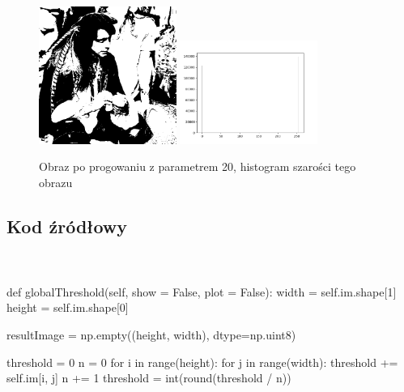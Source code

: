\documentclass[final,a4paper,openany,12pt]{mwbk}
\begin{document}
\begin{figure}[H]
	\begin{center}
		\includegraphics[width=0.4\textwidth]{pirate_gray_globThreshold_result}
		\includegraphics[width=0.4\textwidth]{pirate_gray_globThreshold_histogram}
	\end{center}
	\caption{Obraz po progowaniu z parametrem 20, histogram szarości tego obrazu}
\end{figure}

\subsection*{Kod źródłowy}
\hfill
\\\\
\noindent def globalThreshold(self, show = False, plot = False): \newline
\indent width = self.im.shape[1] \newline
\indent height = self.im.shape[0] \newline

resultImage = np.empty((height, width), dtype=np.uint8) \newline

threshold = 0 \newline
\indent n = 0 \newline
\indent for i in range(height): \newline
\indent for j in range(width): \newline
\indent threshold += self.im[i, j] \newline
\indent \indent \indent n += 1 \newline
\indent \indent \indent threshold = int(round(threshold / n)) \newline
\end{document}
